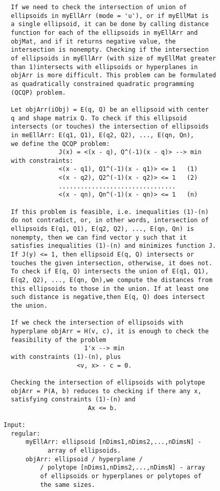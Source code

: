 \begin{enumerate}
\begin{lstlisting}
  If we need to check the intersection of union of
  ellipsoids in myEllArr (mode = 'u'), or if myEllMat is
  a single ellipsoid, it can be done by calling distance
  function for each of the ellipsoids in myEllArr and
  objMat, and if it returns negative value, the
  intersection is nonempty. Checking if the intersection
  of ellipsoids in myEllArr (with size of myEllMat greater
  than 1)intersects with ellipsoids or hyperplanes in
  objArr is more difficult. This problem can be formulated
  as quadratically constrained quadratic programming
  (QCQP) problem.

  Let objArr(iObj) = E(q, Q) be an ellipsoid with center
  q and shape matrix Q. To check if this ellipsoid
  intersects (or touches) the intersection of ellipsoids
  in meEllArr: E(q1, Q1), E(q2, Q2), ..., E(qn, Qn),
  we define the QCQP problem:
               J(x) = <(x - q), Q^(-1)(x - q)> --> min
  with constraints:
               <(x - q1), Q1^(-1)(x - q1)> <= 1   (1)
               <(x - q2), Q2^(-1)(x - q2)> <= 1   (2)
               ................................
               <(x - qn), Qn^(-1)(x - qn)> <= 1   (n)

  If this problem is feasible, i.e. inequalities (1)-(n)
  do not contradict, or, in other words, intersection of
  ellipsoids E(q1, Q1), E(q2, Q2), ..., E(qn, Qn) is
  nonempty, then we can find vector y such that it
  satisfies inequalities (1)-(n) and minimizes function J.
  If J(y) <= 1, then ellipsoid E(q, Q) intersects or
  touches the given intersection, otherwise, it does not.
  To check if E(q, Q) intersects the union of E(q1, Q1),
  E(q2, Q2), ..., E(qn, Qn),we compute the distances from
  this ellipsoids to those in the union. If at least one
  such distance is negative,then E(q, Q) does intersect
  the union.

  If we check the intersection of ellipsoids with
  hyperplane objArr = H(v, c), it is enough to check the
  feasibility of the problem
                      1'x --> min
  with constraints (1)-(n), plus
                    <v, x> - c = 0.

  Checking the intersection of ellipsoids with polytope
  objArr = P(A, b) reduces to checking if there any x,
  satisfying constraints (1)-(n) and
                       Ax <= b.

Input:
  regular:
      myEllArr: ellipsoid [nDims1,nDims2,...,nDimsN] -
            array of ellipsoids.
      objArr: ellipsoid / hyperplane /
          / polytope [nDims1,nDims2,...,nDimsN] - array
          of ellipsoids or hyperplanes or polytopes of
          the same sizes.


\end{lstlisting}
\end{enumerate}
